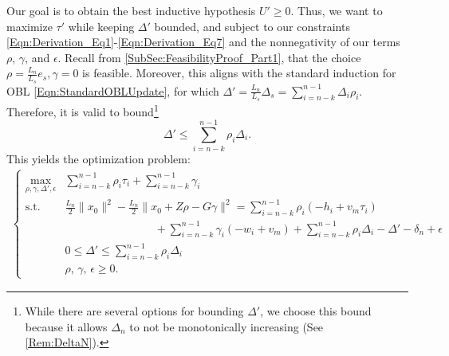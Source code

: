 \documentclass[11pt]{article}
\numberwithin{equation}{section}
\newcommand{\Ucoef}{\rho}
\newcommand{\Wcoef}{\gamma}
\newcommand{\idxArgmin}{m}
\newcommand{\idxLastSuccess}{s}
\newcommand{\idxMem}{k}
\newcommand{\ip}[2]{\sum_{i={n-\idxMem}}^{n-1} {#1}_i {#2}_i}
\newcommand{\fullSum}[1]{\sum_{i={n-\idxMem}}^{n-1} {#1}_i}
\newcommand{\norm}[1]{\|{#1}\|}
\theoremstyle{definition}
\theoremstyle{plain}
\theoremstyle{definition}
\begin{document}
Our goal is to obtain the best inductive hypothesis $U' \geq 0$. Thus, we want to maximize $\tau'$ while keeping $\Delta'$ bounded, and subject to our constraints \eqref{Eqn:Derivation_Eq1}-\eqref{Eqn:Derivation_Eq7} and the nonnegativity of our terms $\Ucoef$, $\Wcoef$, and $\epsilon$. Recall from \cref{SubSec:FeasibilityProof_Part1}, that the choice $\Ucoef = \frac{L_n}{L_\idxLastSuccess} e_\idxLastSuccess, \Wcoef = 0$ is feasible. Moreover, this aligns with the standard induction for OBL \eqref{Eqn:StandardOBLUpdate}, for which $\Delta' = \frac{L_n}{L_\idxLastSuccess} \Delta_\idxLastSuccess = \ip{\Delta}{\Ucoef}$. Therefore, it is valid to bound\footnote{While there are several options for bounding $\Delta'$, we choose this bound because it allows $\Delta_n$ to not be monotonically increasing (See \cref{Rem:DeltaN}).}
\begin{equation} \label{Eqn:Delta_nExpr}
    \Delta' \leq \ip{\Ucoef}{\Delta}.
\end{equation}
This yields the optimization problem:
\begin{align} \label{Eqn:OptProb1}
    \left\{\begin{array}{ll}
            \max_{\Ucoef, \Wcoef, \Delta', \epsilon} & \ip{\Ucoef}{\tau} + \fullSum{\Wcoef} \\
            \text{s.t.} & \frac{L_n}{2}\norm{x_0}^2 - \frac{L_n}{2} \norm{x_0 + Z \Ucoef - G \Wcoef}^2 = \sum_{i=n-k}^{n-1} \Ucoef_i (-h_i + v_\idxArgmin \tau_i) \\
            &  \qquad \qquad \qquad \qquad  + \sum_{i=n-k}^{n-1} \Wcoef_i (-w_i + v_\idxArgmin) + \ip{ \Ucoef}{\Delta} - \Delta' - \delta_n + \epsilon \\
        & 0 \leq \Delta' \leq \ip{\Ucoef}{\Delta} \\
        & \Ucoef,\, \Wcoef, \, \epsilon \geq 0 .
    \end{array}\right.
\end{align}
\end{document}
